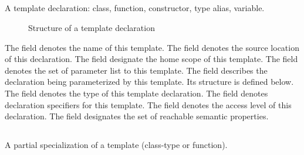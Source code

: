 \subsection{}
\label{sec:ifc:DeclSort:Template}

A template declaration: class, function, constructor, type alias, variable.

\begin{figure}[H]
	\centering
	\caption{Structure of a template declaration}
	\label{fig:ifc-template-decl-structure}
\end{figure}

The  field denotes the name of this template.
The  field denotes the source location of this declaration.
The  field designate the home scope of this template.
The  field denotes the set of parameter list to this template.
The  field describes the declaration being parameterized by this template.  Its structure is defined below.
The  field denotes the type of this template declaration.
The  field denotes declaration specifiers for this template.
The  field denotes the access level of this declaration.
The  field designates the set of reachable semantic properties.


\subsection{}
\label{sec:ifc:DeclSort:PartialSpecialization}

A partial specialization of a
template (class-type or function). 

